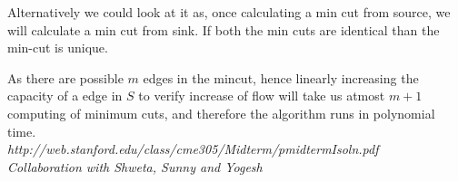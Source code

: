 \documentclass[addpoints]{exam}
\begin{document}
\begin{questions}
\begin{solution}
Alternatively we could look at it as, once calculating a min cut from source, we will calculate a min cut from sink. If both the min cuts are identical than the min-cut is unique.

As there are possible $m$ edges in the mincut, hence linearly increasing the capacity of a edge in $S$ to verify increase of flow will take us atmost $m + 1$ computing of minimum cuts, and therefore the algorithm runs in polynomial time.\\

\emph{http://web.stanford.edu/class/cme305/Midterm/pmidtermIsoln.pdf}\\
\emph{Collaboration with Shweta, Sunny and Yogesh}
\end{solution}

\end{questions}
\end{document}

